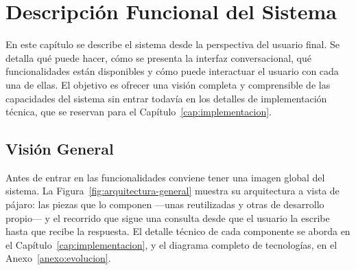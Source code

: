 \chapter{Descripción Funcional del Sistema}
\label{cap:funcional}

En este capítulo se describe el sistema desde la perspectiva del usuario final. Se detalla qué puede hacer, cómo se presenta la interfaz conversacional, qué funcionalidades están disponibles y cómo puede interactuar el usuario con cada una de ellas. El objetivo es ofrecer una visión completa y comprensible de las capacidades del sistema sin entrar todavía en los detalles de implementación técnica, que se reservan para el Capítulo~\ref{cap:implementacion}.

\section{Visión General}

Antes de entrar en las funcionalidades conviene tener una imagen global del sistema. La Figura~\ref{fig:arquitectura-general} muestra su arquitectura a vista de pájaro: las piezas que lo componen ---unas reutilizadas y otras de desarrollo propio--- y el recorrido que sigue una consulta desde que el usuario la escribe hasta que recibe la respuesta. El detalle técnico de cada componente se aborda en el Capítulo~\ref{cap:implementacion}, y el diagrama completo de tecnologías, en el Anexo~\ref{anexo:evolucion}.


